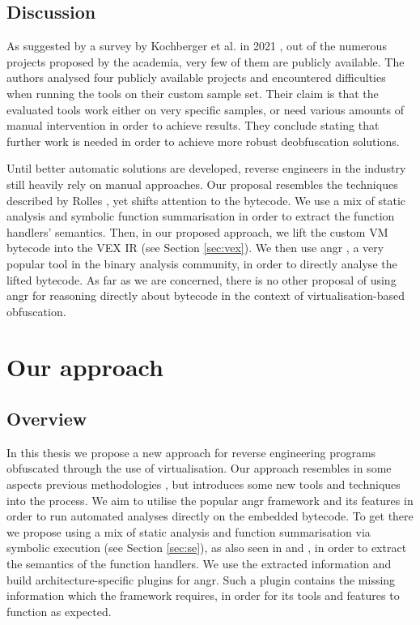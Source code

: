 \section{Discussion}

As suggested by a survey by Kochberger et al. in 2021 \cite{kochberger2021sok}, out of the numerous projects proposed by the academia, very few of them are publicly available. The authors analysed four publicly available projects and encountered difficulties when running the tools on their custom sample set. Their claim is that the evaluated tools work either on very specific samples, or need various amounts of manual intervention in order to achieve results. They conclude stating that further work is needed in order to achieve more robust deobfuscation solutions.

Until better automatic solutions are developed, reverse engineers in the industry still heavily rely on manual approaches. Our proposal resembles the techniques described by Rolles \cite{rolles2009unpacking}, yet shifts attention to the bytecode. We use a mix of static analysis and symbolic function summarisation in order to extract the function handlers' semantics. Then, in our proposed approach, we lift the custom \gls{VM} bytecode into the VEX \gls{IR} (see Section \ref{sec:vex}). We then use angr \cite{angr}, a very popular tool in the binary analysis community, in order to directly analyse the lifted bytecode. As far as we are concerned, there is no other proposal of using angr for reasoning directly about bytecode in the context of virtualisation-based obfuscation.

\chapter{Our approach}
\label{ch:our_approach}

\section{Overview}

In this thesis we propose a new approach for reverse engineering programs obfuscated through the use of virtualisation. Our approach resembles in some aspects previous methodologies \cite{rolles2009unpacking}, but introduces some new tools and techniques into the process. We aim to utilise the popular angr framework and its features in order to run automated analyses directly on the embedded bytecode. To get there we propose using a mix of static analysis and function summarisation via symbolic execution (see Section \ref{sec:se}), as also seen in \cite{symbolic_deobf_2018} and \cite{liang2018}, in order to extract the semantics of the function handlers. We use the extracted information and build architecture-specific plugins for angr. Such a plugin contains the missing information which the framework requires, in order for its tools and features to function as expected.

